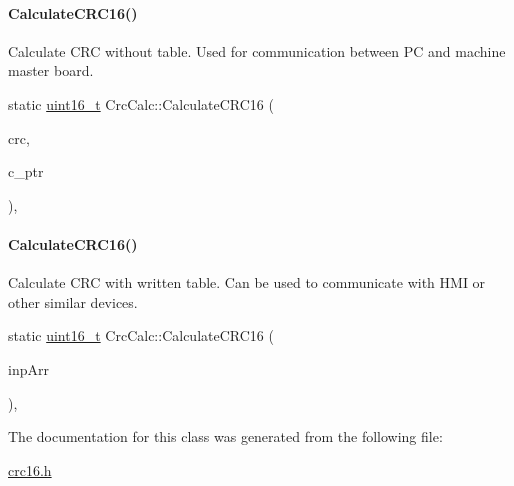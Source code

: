 \paragraph{\texorpdfstring{Calculate\+C\+R\+C16()}{CalculateCRC16()}{\footnotesize\ttfamily [1/2]}}
Calculate CRC without table. Used for communication between PC and machine master board.\\
{\footnotesize\ttfamily static \mbox{\hyperlink{settings_8h_a017dd44e68049ffdd31500a8cd01ba68}{uint16\+\_\+t}} Crc\+Calc\+::\+Calculate\+C\+R\+C16 (\begin{DoxyParamCaption}\item[{\mbox{\hyperlink{settings_8h_a017dd44e68049ffdd31500a8cd01ba68}{uint16\+\_\+t}}}]{crc,  }\item[{Q\+Byte\+Array}]{c\+\_\+ptr }\end{DoxyParamCaption}){\ttfamily [inline]}, {\ttfamily [static]}}

\mbox{\label{classCrcCalc_aa4d7542b130a13fb3d675b885cfadbbd}} 
\paragraph{\texorpdfstring{Calculate\+C\+R\+C16()}{CalculateCRC16()}{\footnotesize\ttfamily [2/2]}}
Calculate CRC with written table. Can be used to communicate with HMI or other similar devices.\\
{\footnotesize\ttfamily static \mbox{\hyperlink{settings_8h_a017dd44e68049ffdd31500a8cd01ba68}{uint16\+\_\+t}} Crc\+Calc\+::\+Calculate\+C\+R\+C16 (\begin{DoxyParamCaption}\item[{Q\+Byte\+Array}]{inp\+Arr }\end{DoxyParamCaption})\hspace{0.3cm}{\ttfamily [inline]}, {\ttfamily [static]}}

The documentation for this class was generated from the following file\+:\begin{DoxyCompactItemize}
\item 
\mbox{\hyperlink{crc16_8h}{crc16.\+h}}\end{DoxyCompactItemize}
\newpage